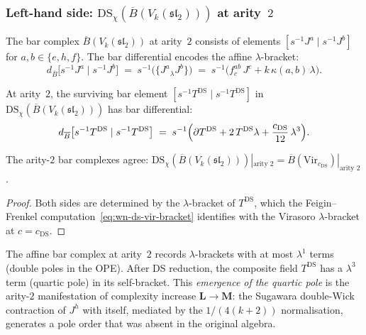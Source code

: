 \documentclass[11pt]{article}
\newcommand{\fsl}{\mathfrak{sl}}
\newcommand{\barB}{\overline{B}}
\begin{document}
\subsubsection*{Left-hand side:
$\mathrm{DS}_\chi(\barB(V_k(\fsl_2)))$ at arity~$2$}

The bar complex $\barB(V_k(\fsl_2))$ at arity~$2$ consists
of elements $[s^{-1}J^a \mid s^{-1}J^b]$ for
$a, b \in \{e, h, f\}$.  The bar differential encodes the
affine $\lambda$-bracket:
\begin{equation}\label{eq:wn-aff-bar-2}
d_{\barB}\bigl[s^{-1}J^a \mid s^{-1}J^b\bigr]
\;=\;
s^{-1}\bigl(\{J^a{}_\lambda J^b\}\bigr)
\;=\;
s^{-1}\bigl(f^{ab}_c\,J^c + k\,\kappa(a,b)\,\lambda\bigr).
\end{equation}

At arity~$2$, the surviving bar element
$[s^{-1}T^{\mathrm{DS}} \mid s^{-1}T^{\mathrm{DS}}]$
in $\mathrm{DS}_\chi(\barB(V_k(\fsl_2)))$ has bar
differential:
\begin{equation}\label{eq:wn-ds-bar-2}
d_{\barB}\bigl[s^{-1}T^{\mathrm{DS}}
\mid s^{-1}T^{\mathrm{DS}}\bigr]
\;=\;
s^{-1}\Bigl(\partial T^{\mathrm{DS}}
+ 2\,T^{\mathrm{DS}}\lambda
+ \frac{c_{\mathrm{DS}}}{12}\,\lambda^3\Bigr).
\end{equation}

\begin{proposition}%
\label{prop:wn-ds-bar-arity-2}
The arity-$2$ bar complexes agree:
$\mathrm{DS}_\chi(\barB(V_k(\fsl_2)))|_{\text{arity }2}
= \barB(\mathrm{Vir}_{c_{\mathrm{DS}}})|_{\text{arity }2}$.
\end{proposition}

\begin{proof}
Both sides are determined by the $\lambda$-bracket of $T^{\mathrm{DS}}$,
which the Feigin--Frenkel computation~\eqref{eq:wn-ds-vir-bracket}
identifies with the Virasoro $\lambda$-bracket at $c = c_{\mathrm{DS}}$.
\end{proof}

\begin{remark}
\label{rem:wn-quartic-manufactured}
The affine bar complex at arity~$2$ records
$\lambda$-brackets with at most $\lambda^1$ terms (double
poles in the OPE).  After DS reduction, the composite field
$T^{\mathrm{DS}}$ has a $\lambda^3$ term (quartic pole)
in its self-bracket.  This \emph{emergence of the quartic
pole} is the arity-$2$ manifestation of complexity increase
$\mathbf{L} \to \mathbf{M}$: the Sugawara
double-Wick contraction of $J^h$ with itself, mediated by
the $1/(4(k+2))$ normalisation, generates a pole order
that was absent in the original algebra.
\end{remark}
\end{document}
